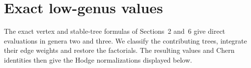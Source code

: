 \section{Exact low-genus values}
\label{sec:appendix-c}

The exact vertex and stable-tree formulas of Sections~2 and~6
give direct evaluations in genera two and three. We classify the
contributing trees, integrate their edge weights and restore the
factorials. The resulting values and Chern identities then
give the Hodge normalizations displayed below.


